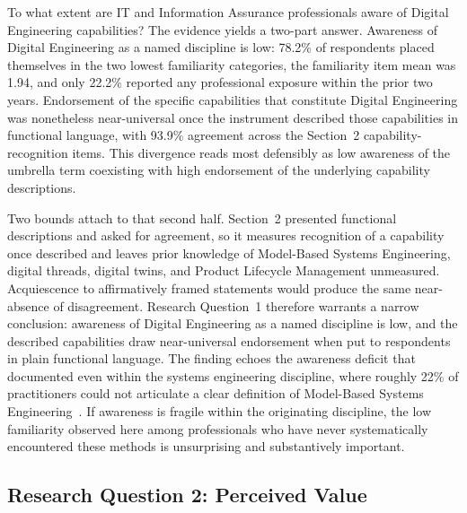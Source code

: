 To what extent are IT and Information Assurance professionals aware of Digital Engineering capabilities? The evidence yields a two-part answer. Awareness of Digital Engineering as a named discipline is low: 78.2\% of respondents placed themselves in the two lowest familiarity categories, the familiarity item mean was 1.94, and only 22.2\% reported any professional exposure within the prior two years. Endorsement of the specific capabilities that constitute Digital Engineering was nonetheless near-universal once the instrument described those capabilities in functional language, with 93.9\% agreement across the Section~2 capability-recognition items. This divergence reads most defensibly as low awareness of the umbrella term coexisting with high endorsement of the underlying capability descriptions.

Two bounds attach to that second half. Section~2 presented functional descriptions and asked for agreement, so it measures recognition of a capability once described and leaves prior knowledge of Model-Based Systems Engineering, digital threads, digital twins, and Product Lifecycle Management unmeasured. Acquiescence to affirmatively framed statements would produce the same near-absence of disagreement. Research Question~1 therefore warrants a narrow conclusion: awareness of Digital Engineering as a named discipline is low, and the described capabilities draw near-universal endorsement when put to respondents in plain functional language. The finding echoes the awareness deficit that \citeauthor{Henderson_McDermott_Salado_2024} documented even within the systems engineering discipline, where roughly 22\% of practitioners could not articulate a clear definition of Model-Based Systems Engineering~\parencite{Henderson_McDermott_Salado_2024}. If awareness is fragile within the originating discipline, the low familiarity observed here among professionals who have never systematically encountered these methods is unsurprising and substantively important.

\subsection{Research Question 2: Perceived Value}

